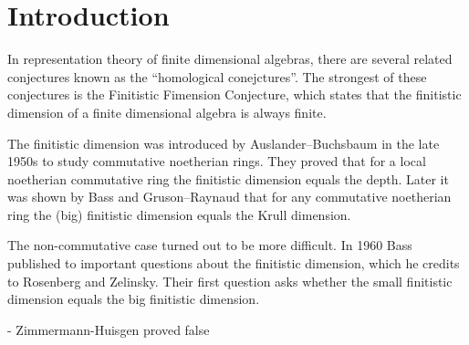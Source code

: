 \section*{Introduction}
%

In representation theory of finite dimensional algebras, there are several related conjectures known as the ``homological conejctures''. The strongest of these conjectures is the Finitistic Fimension Conjecture, which states that the finitistic dimension of a finite dimensional algebra is always finite.

The finitistic dimension was introduced by Auslander--Buchsbaum in the late 1950s to study commutative noetherian rings. They proved that for a local noetherian commutative ring the finitistic dimension equals the depth\cite{AB57}. Later it was shown by Bass and Gruson--Raynaud that for any commutative noetherian ring the (big) finitistic dimension equals the Krull dimension\cite{Bass62,RG71}.

The non-commutative case turned out to be more difficult. In 1960 Bass published to important questions about the finitistic dimension\cite{Bass60}, which he credits to Rosenberg and Zelinsky. Their first question asks whether the small finitistic dimension equals the big finitistic dimension. 

- Zimmermann-Huisgen proved false \cite{ZH92}

